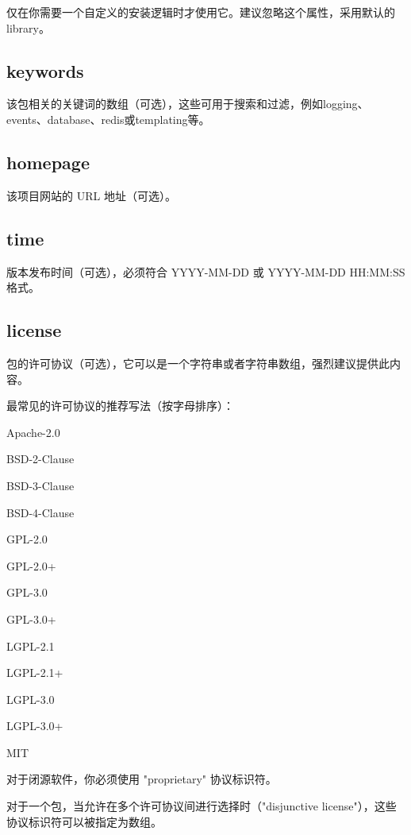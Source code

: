 仅在你需要一个自定义的安装逻辑时才使用它。建议忽略这个属性，采用默认的 library。

\subsection{keywords}

该包相关的关键词的数组（可选），这些可用于搜索和过滤，例如logging、events、database、redis或templating等。


\subsection{homepage}

该项目网站的 URL 地址（可选）。

\subsection{time}

版本发布时间（可选），必须符合 YYYY-MM-DD 或 YYYY-MM-DD HH:MM:SS 格式。

\subsection{license}

包的许可协议（可选），它可以是一个字符串或者字符串数组，强烈建议提供此内容。

最常见的许可协议的推荐写法（按字母排序）：

\begin{compactitem}
\item Apache-2.0
\item BSD-2-Clause
\item BSD-3-Clause
\item BSD-4-Clause
\item GPL-2.0
\item GPL-2.0+
\item GPL-3.0
\item GPL-3.0+
\item LGPL-2.1
\item LGPL-2.1+
\item LGPL-3.0
\item LGPL-3.0+
\item MIT
\end{compactitem}

对于闭源软件，你必须使用 "proprietary" 协议标识符。

对于一个包，当允许在多个许可协议间进行选择时（"disjunctive license"），这些协议标识符可以被指定为数组。

